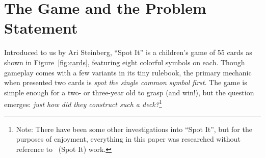 \documentclass[11pt, oneside]{article} 	%
\begin{document}
\section{The Game and the Problem Statement}

Introduced to us by Ari Steinberg, ``Spot It'' is a children's game of 55 cards as shown in Figure~\ref{fig:cards}, featuring eight colorful symbols on each. Though gameplay comes with a few variants in its tiny rulebook, the primary mechanic when presented two cards is \emph{spot the single common symbol first}. The game is simple enough for a two- or three-year old to grasp (and win!), but the question emerges: \emph{just how did they construct such a deck?}\footnote{Note: There have been some other investigations into ``Spot It''\cite{2}, but for the purposes of enjoyment, everything in this paper was researched without reference to \ (Spot It) work.}
\end{document}
